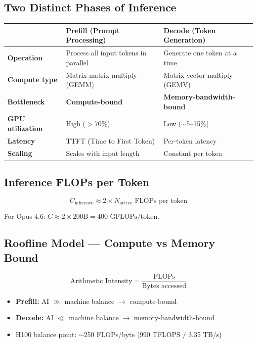 \documentclass[11pt,a4paper]{article}
\begin{document}
\subsection{Two Distinct Phases of Inference}

\begin{center}
\begin{tabular}{lL{5cm}L{5cm}}
\toprule
& \textbf{Prefill (Prompt Processing)} & \textbf{Decode (Token Generation)} \\
\midrule
\textbf{Operation} & Process all input tokens in parallel & Generate one token at a time \\
\textbf{Compute type} & Matrix-matrix multiply (GEMM) & Matrix-vector multiply (GEMV) \\
\textbf{Bottleneck} & \textbf{Compute-bound} & \textbf{Memory-bandwidth-bound} \\
\textbf{GPU utilization} & High ($>$70\%) & Low ($\sim$5--15\%) \\
\textbf{Latency} & TTFT (Time to First Token) & Per-token latency \\
\textbf{Scaling} & Scales with input length & Constant per token \\
\bottomrule
\end{tabular}
\end{center}

\subsection{Inference FLOPs per Token}

$$C_{\text{inference}} \approx 2 \times N_{\text{active}} \text{ FLOPs per token}$$

For Opus 4.6: $C \approx 2 \times 200\text{B} = 400\text{ GFLOPs/token}$.

\subsection{Roofline Model --- Compute vs Memory Bound}

$$\text{Arithmetic Intensity} = \frac{\text{FLOPs}}{\text{Bytes accessed}}$$

\begin{itemize}[itemsep=1pt]
  \item \textbf{Prefill:} AI $\gg$ machine balance $\to$ compute-bound
  \item \textbf{Decode:} AI $\ll$ machine balance $\to$ memory-bandwidth-bound
  \item H100 balance point: $\sim$250 FLOPs/byte (990 TFLOPS / 3.35 TB/s)
\end{itemize}
\end{document}
